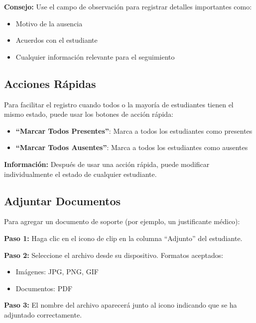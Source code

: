 \documentclass[11pt,a4paper]{article}
\begin{document}
\begin{tipbox}
\textbf{Consejo:} Use el campo de observación para registrar detalles importantes como:
\begin{itemize}
  \item Motivo de la ausencia
  \item Acuerdos con el estudiante
  \item Cualquier información relevante para el seguimiento
\end{itemize}
\end{tipbox}

\subsection{Acciones Rápidas}

Para facilitar el registro cuando todos o la mayoría de estudiantes tienen el mismo estado, puede usar los botones de acción rápida:

\begin{itemize}
  \item \textbf{``Marcar Todos Presentes''}: Marca a todos los estudiantes como presentes
  \item \textbf{``Marcar Todos Ausentes''}: Marca a todos los estudiantes como ausentes
\end{itemize}

\begin{infobox}
\textbf{Información:} Después de usar una acción rápida, puede modificar individualmente el estado de cualquier estudiante.
\end{infobox}

\subsection{Adjuntar Documentos}

Para agregar un documento de soporte (por ejemplo, un justificante médico):

\textbf{Paso 1:} Haga clic en el icono de clip en la columna ``Adjunto'' del estudiante.

\textbf{Paso 2:} Seleccione el archivo desde su dispositivo. Formatos aceptados:
\begin{itemize}
  \item Imágenes: JPG, PNG, GIF
  \item Documentos: PDF
\end{itemize}

\textbf{Paso 3:} El nombre del archivo aparecerá junto al icono indicando que se ha adjuntado correctamente.
\end{document}

